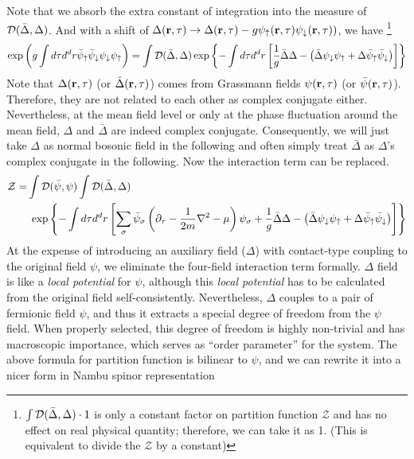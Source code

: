 Note that we absorb the extra constant of integration into the measure of $\mathcal{D}(\bar\Delta,\Delta)$.
And with a shift of $\Delta(\mathbf{r},\tau)\rightarrow\Delta(\mathbf{r},\tau)-g\psi_{\uparrow}(\mathbf{r},\tau)\psi_{\downarrow}(\mathbf{r},\tau))$, we have 
\footnote{$\int{\ensuremath{\mathcal{D}}(\bar\Delta,\Delta)}\cdot1$ is only a constant factor on partition function $\mathcal{Z}$ and has no effect on real physical quantity; therefore, we can take it as 1. (This is equivalent to  divide the $\mathcal{Z}$ by a constant)}
\begin{equation}
\exp\left(g\int{d\tau{}d^{d}r}\bar{\psi}_{\uparrow}\bar\psi_{\downarrow}\psi_{\downarrow}\psi_{\uparrow}\right)=
\int{\ensuremath{\mathcal{D}}(\bar\Delta,\Delta)}\exp\left\{-\int{d\tau{d^{d}r}}\left[\frac{1}{g}{\bar\Delta}{\Delta}-\left(\bar\Delta\psi_{\downarrow}\psi_{\uparrow}+\Delta\bar\psi_{\uparrow}\bar\psi_{\downarrow}\right)\right]\right\}
\end{equation}
Note that  $\Delta(\mathbf{r},\tau)$ (or $\bar\Delta(\mathbf{r},\tau)$) comes from  Grassmann fields $\psi(\mathbf{r},\tau)$ (or $\bar\psi(\mathbf{r},\tau)$). Therefore, they are not related to each other as complex conjugate either.  Nevertheless, at the mean field level or only at the phase fluctuation around the mean field, $\Delta$  and $\bar\Delta$ are indeed complex conjugate.  Consequently, we will just take $\Delta$  as normal bosonic field in the following and often simply treat $\bar\Delta$ as $\Delta$'s complex conjugate in the following. Now the interaction term can be replaced.
\begin{align*}
\mathcal{Z}=&\int{}\mathcal{D}(\bar\psi,\psi)\int{\ensuremath{\mathcal{D}}(\bar\Delta,\Delta)}\\
&\;\exp\left\{-\int{d\tau{d^{d}r}}\left[\sum_{\sigma}\bar\psi_{\sigma}\left(\partial_{\tau}-\frac{1}{2m}\nabla^{2}-\mu\right)\psi_{\sigma}+\frac{1}{g}{\bar\Delta}{\Delta}-\left(\bar\Delta\psi_{\downarrow}\psi_{\uparrow}+\Delta\bar\psi_{\uparrow}\bar\psi_{\downarrow}\right)\right]\right\}
\end{align*}
At the expense of introducing an auxiliary field ($\Delta$) with contact-type coupling to the original field $\psi$, we eliminate the four-field interaction term formally.  $\Delta$ field is like a \emph{local potential} for $\psi$, although this \emph{local potential} has to be calculated from the original field self-consistently.  Nevertheless, $\Delta$ couples to a pair of fermionic field $\psi$, and thus it extracts a special degree of freedom from the $\psi$ field.  When properly selected, this degree of freedom is highly non-trivial and has macroscopic importance, which serves as ``order parameter'' for the system.  The above formula for partition function is bilinear to $\psi$, and we can rewrite it into a nicer form in Nambu spinor representation
